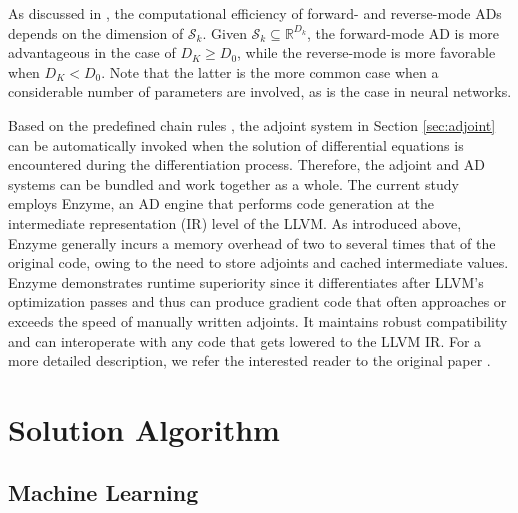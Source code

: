 \documentclass[preprint,3p,12pt,sort&compress]{elsarticle}
\begin{document}
As discussed in \cite{blondel2024elements}, the computational efficiency of forward- and reverse-mode ADs depends on the dimension of $\mathcal S_k$.
Given $\mathcal S_k \subseteq \mathbb R^{D_k}$, the forward-mode AD is more advantageous in the case of $D_K\geq D_0$, while the reverse-mode is more favorable when $D_K<D_0$.
Note that the latter is the more common case when a considerable number of parameters are involved, as is the case in neural networks.

Based on the predefined chain rules \cite{white2024chain}, the adjoint system in Section \ref{sec:adjoint} can be automatically invoked when the solution of differential equations is encountered during the differentiation process.
Therefore, the adjoint and AD systems can be bundled and work together as a whole.
The current study employs Enzyme, an AD engine that performs code generation at the intermediate representation (IR) level of the LLVM.
As introduced above, Enzyme generally incurs a memory overhead of two to several times that of the original code, owing to the need to store adjoints and cached intermediate values.
Enzyme demonstrates runtime superiority since it differentiates after LLVM’s optimization passes and thus can produce gradient code that often approaches or exceeds the speed of manually written adjoints. 
It maintains robust compatibility and can interoperate with any code that gets lowered to the LLVM IR. 
For a more detailed description, we refer the interested reader to the original paper \cite{moses2020instead}.

\section{Solution Algorithm}\label{sec:alg}

\subsection{Machine Learning}
\end{document}
